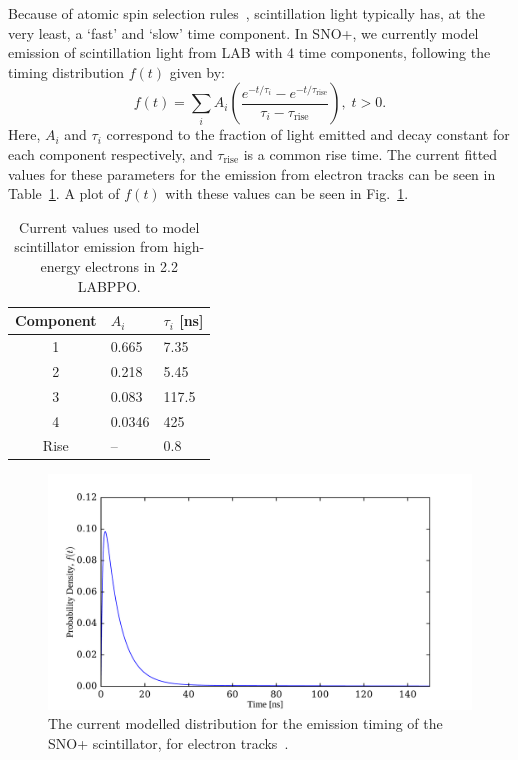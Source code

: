 Because of atomic spin selection rules~\cite{birksChapterScintillationProcess1967}, %
scintillation light typically has, at the very least, a `fast' and `slow' time component. In SNO+, we currently model emission of scintillation light from LAB with 4 time components, following the timing distribution $f(t)$ given by:
\begin{equation}
    f(t) = \sum_{i}A_{i}\left(\frac{e^{-t/\tau_{i}}-e^{-t/\tau_{\mathrm{rise}}}}{\tau_{i}-\tau_\mathrm{rise}}\right),\; t > 0.
\end{equation}
Here, $A_{i}$ and $\tau_{i}$ correspond to the fraction of light emitted and decay constant for each component respectively, and $\tau_\mathrm{rise}$ is a common rise time. The current fitted values for these parameters for the emission from electron tracks can be seen in Table~\ref{tab:scint_reem_params}. A plot of $f(t)$ with these values can be seen in Fig.~\ref{fig:typical_tres_dist_physics}.

\begin{table}
    \centering
    \begin{tabular}{c p{2cm} p{2cm}}
        \hline
        Component & $A_{i}$ & $\tau_{i}$ [ns] \\ \hline \hline
        1         & 0.665   & 7.35  \\
        2         & 0.218   & 5.45  \\
        3         & 0.083   & 117.5 \\
        4         & 0.0346  & 425   \\
        Rise      & --      & 0.8   \\
        \hline
    \end{tabular}
    \caption{Current values used to model scintillator emission from high-energy electrons in \SI{2.2}{\gpl} LABPPO.}
    \label{tab:scint_reem_params}
\end{table}

\begin{figure}
    \centering
    \includegraphics[width=\linewidth]{2_Detector/Figs/scintillator_emission_timing_profile_LABPPO22gl.pdf}
    \caption[The current modelled distribution for the emission timing of the SNO+ scintillator]{The current modelled distribution for the emission timing of the SNO+ scintillator, for electron tracks~\cite{}.%
    }
    \label{fig:typical_tres_dist_physics}
\end{figure}

